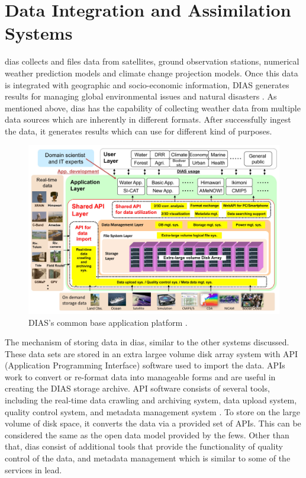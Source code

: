 \section{Data Integration and Assimilation Systems}
\label{se:dias}

\acrfull{dias} collects and files data from satellites, ground observation stations, numerical weather prediction models and climate change projection models. Once this data is integrated with geographic and socio-economic information, DIAS generates results for managing global environmental issues and natural disasters \cite{Kawasaki2018DataReduction}. As mentioned above, \acrshort{dias} has the capability of collecting weather data from multiple data sources which are inherently in different formats. After successfully ingest the data, it generates results which can use for different kind of purposes.

\begin{figure}[htp]
    \centering
    \includegraphics[width=1\textwidth]{lit/other/dias_common_base_application_platform.jpg}
    \caption[DIAS’s common base application platform.]{DIAS’s common base application platform \cite{Kawasaki2018DataReduction}.}
    \label{fi:dias_common_platform}
\end{figure}

The mechanism of storing data in \acrshort{dias}, similar to the other systems discussed.
These data sets are stored in an extra largee volume disk array system with API (Application Programming Interface) software used to import the data. APIs work to convert or re-format data into manageable forms and are useful in creating the DIAS storage archive. API software consists of several tools, including the real-time data crawling and archiving system, data upload system, quality control system, and metadata management system \cite{Kawasaki2018DataReduction}. To store on the large volume of disk space, it converts the data via a provided set of APIs. This can be considered the same as the open data model provided by the \acrshort{fews}. Other than that, \acrshort{dias} consist of additional tools that provide the functionality of quality control of the data, and metadata management which is similar to some of the services in \acrshort{lead}.

